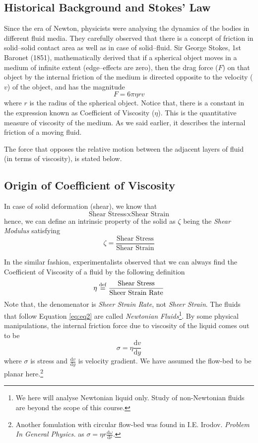\documentclass[11pt, a4paper, abstract=true]{scrartcl}
\begin{document}
\subsection{Historical Background and Stokes' Law}
Since the era of Newton, physicists were analysing the dynamics of the bodies in different fluid media. They carefully observed that there is a concept of friction in solid–solid contact area as well as in case of solid–fluid. Sir George Stokes, 1st Baronet (1851), mathematically derived that if a spherical object moves in a medium of infinite extent (edge–effects are zero), then the drag force (\(F\)) on that object by the internal friction of the medium is directed opposite to the velocity (\(v\)) of the object, and has the magnitude
\begin{equation}
    F = 6 \pi \eta r v
\end{equation}
where \(r\) is the radius of the spherical object. Notice that, there is a constant in the expression  known as Coefficient of Viscosity (\(\eta\)). This is the quantitative measure of viscosity of the medium. As we said earlier, it describes the internal friction of a moving fluid. 

The force that opposes the relative motion between the adjacent layers of fluid (in terms of viscosity), is stated below.

\subsection{Origin of Coefficient of Viscosity}
In case of solid deformation (shear), we know that \[\text{Shear Stress} \propto \text{Shear Strain}\] hence, we can define an intrinsic property of the solid as \(\zeta\) being the \emph{Shear Modulus} satisfying \[\zeta = \frac{\text{Shear Stress}}{\text{Shear Strain}}\]

In the similar fashion, experimentalists observed that we can always find the Coefficient of Viscosity of a fluid by the following definition
\begin{equation}
    \eta \overset{\mathrm{def}}{=} \frac{\text{Shear Stress}}{\text{Sheer Strain Rate}}
    \label{eq:eq2}
\end{equation}
Note that, the denomenator is \emph{Sheer Strain Rate}, not \emph{Sheer Strain}. The fluids that follow Equation \ref{eq:eq2} are called \emph{Newtonian Fluids}\footnote{We here will analyse Newtonian liquid only. Study of non-Newtonian fluids are beyond the scope of this course.}. By some physical manipulations, the internal friction force due to viscosity of the liquid comes out to be
\begin{equation}
    \sigma = \eta \frac{\text{d}v}{\text{d}y}
\end{equation}
where \(\sigma\) is stress and \(\frac{\text{d}v}{\text{d}y}\) is velocity gradient. We have assumed the flow-bed to be planar here.\footnote{Another fomulation with circular flow-bed was found in I.E. Irodov. \emph{Problem In General Physics.} as \(\sigma = \eta r \frac{\text{d}\omega}{\text{d}r}\).}
\end{document}
